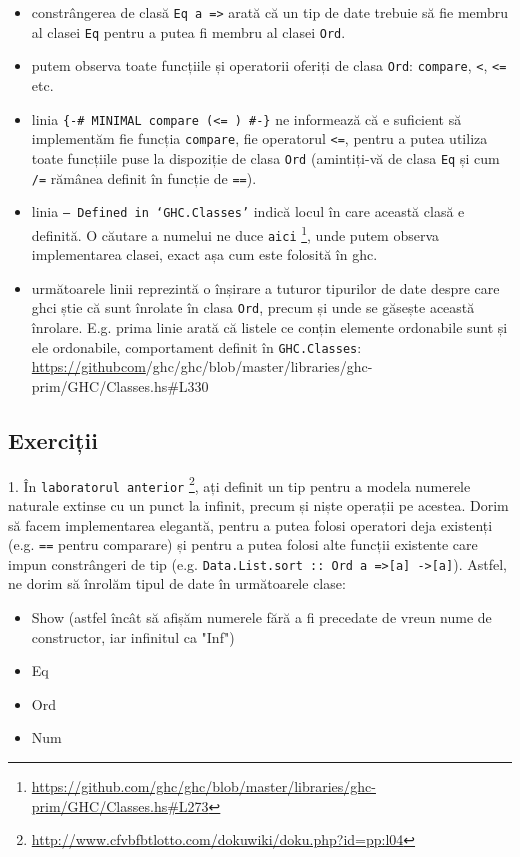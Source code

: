 \begin{itemize}
	\item  constrângerea de clasă \texttt{Eq a =\textgreater } arată că un tip de date trebuie să fie membru al clasei \texttt{Eq} pentru a putea fi membru al clasei \texttt{Ord}.
	\item  putem observa toate funcțiile și operatorii oferiți de clasa \texttt{Ord}: \texttt{compare}, \texttt{\textless }, \texttt{\textless =} etc.
	\item  linia \texttt{\{-\# MINIMAL compare \textbar (\textless = ) \#-\}} ne informează că e suficient să implementăm fie funcția \texttt{compare}, fie operatorul \texttt{\textless =}, pentru a putea utiliza toate funcțiile puse la dispoziție de clasa \texttt{Ord} (amintiți-vă de clasa \texttt{Eq} și cum \texttt{/=} rămânea definit în funcție de \texttt{==}).
	\item  linia \texttt{-- Defined in ‘GHC.Classes’} indică locul în care această clasă e definită. O căutare a numelui ne duce \texttt{aici} \footnote{\url{https://github.com/ghc/ghc/blob/master/libraries/ghc-prim/GHC/Classes.hs\#L273}}, unde putem observa implementarea clasei, exact așa cum este folosită în ghc.
	\item  următoarele linii reprezintă o înșirare a tuturor tipurilor de date despre care ghci știe că sunt înrolate în clasa \texttt{Ord}, precum și unde se găsește această înrolare. E.g. prima linie arată că listele ce conțin elemente ordonabile sunt și ele ordonabile, comportament definit în \texttt{GHC.Classes}: \url{https://githubcom}/ghc/ghc/blob/master/libraries/ghc-prim/GHC/Classes.hs\#L330
\end{itemize}

\subsection*{ Exerciții }

1. În \texttt{laboratorul anterior} \footnote{\url{http://www.cfvbfbtlotto.com/dokuwiki/doku.php?id=pp:l04}}, ați definit un tip pentru a modela numerele naturale extinse cu un punct la infinit, precum și niște operații pe acestea. Dorim să facem implementarea elegantă, pentru a putea folosi operatori deja existenți (e.g. \texttt{==} pentru comparare) și pentru a putea folosi alte funcții existente care impun constrângeri de tip (e.g. \texttt{Data.List.sort :: Ord a =\textgreater  [a] -\textgreater  [a]}). Astfel, ne dorim să înrolăm tipul de date în următoarele clase:

\begin{itemize}
	\item  Show (astfel încât să afișăm numerele fără a fi precedate de vreun nume de constructor, iar infinitul ca "Inf")
	\item  Eq
	\item  Ord
	\item  Num
\end{itemize}

